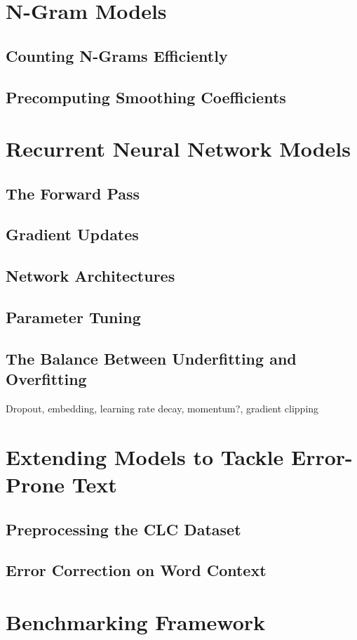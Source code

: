 \documentclass[a4paper, 12pt]{report}
\begin{document}
\section{N-Gram Models}
\subsection{Counting N-Grams Efficiently}
\subsection{Precomputing Smoothing Coefficients}
\section{Recurrent Neural Network Models}
\subsection{The Forward Pass}
\subsection{Gradient Updates}
\subsection{Network Architectures}
\subsection{Parameter Tuning}
\subsection{The Balance Between Underfitting and Overfitting}
Dropout, embedding, learning rate decay, momentum?, gradient clipping
\section{Extending Models to Tackle Error-Prone Text}
\subsection{Preprocessing the CLC Dataset}
\subsection{Error Correction on Word Context}
\section{Benchmarking Framework}
\end{document}
